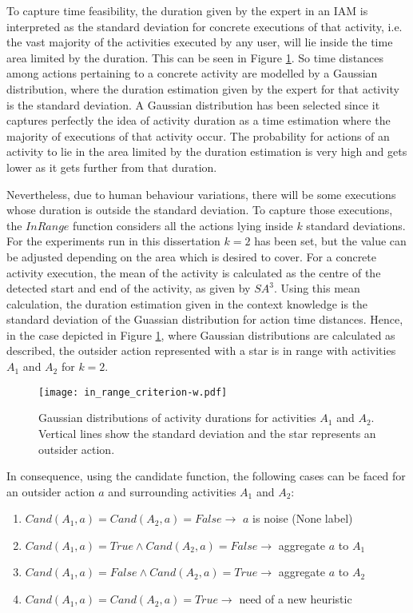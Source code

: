 To capture time feasibility, the duration given by the expert in an IAM is interpreted as the standard deviation for concrete executions of that activity, i.e. the vast majority of the activities executed by any user, will lie inside the time area limited by the duration. This can be seen in Figure \ref{fig-in-range}. So time distances among actions pertaining to a concrete activity are modelled by a Gaussian distribution, where the duration estimation given by the expert for that activity is the standard deviation. A Gaussian distribution has been selected since it captures perfectly the idea of activity duration as a time estimation where the majority of executions of that activity occur. The probability for actions of an activity to lie in the area limited by the duration estimation is very high and gets lower as it gets further from that duration.

Nevertheless, due to human behaviour variations, there will be some executions whose duration is outside the standard deviation. To capture those executions, the $InRange$ function considers all the actions lying inside $k$ standard deviations. For the experiments run in this dissertation $k=2$ has been set, but the value can be adjusted depending on the area which is desired to cover. For a concrete activity execution, the mean of the activity is calculated as the centre of the detected start and end of the activity, as given by $SA^3$. Using this mean calculation, the duration estimation given in the context knowledge is the standard deviation of the Guassian distribution for action time distances. Hence, in the case depicted in Figure \ref{fig-in-range}, where Gaussian distributions are calculated as described, the outsider action represented with a star is in range with activities $A_1$ and $A_2$ for $k=2$.

\begin{figure}[htbp]%
\centering
\texttt{[image: in\_range\_criterion-w.pdf]}
    \caption{Gaussian distributions of activity durations for activities $A_1$ and $A_2$. Vertical lines show the standard deviation and the star represents an outsider action.}
    \label{fig-in-range}
\end{figure}

In consequence, using the candidate function, the following cases can be faced for an outsider action $a$ and surrounding activities $A_1$ and $A_2$:

\begin{enumerate}
 \item $Cand(A_1, a) = Cand(A_2, a) = False \rightarrow$ $a$ is noise (None label)
 \item $Cand(A_1, a) = True \wedge Cand(A_2, a) = False \rightarrow$ aggregate $a$ to $A_1$
 \item $Cand(A_1, a) = False \wedge Cand(A_2, a) = True \rightarrow$ aggregate $a$ to $A_2$
 \item $Cand(A_1, a) = Cand(A_2, a) = True \rightarrow$ need of a new heuristic
\end{enumerate}

